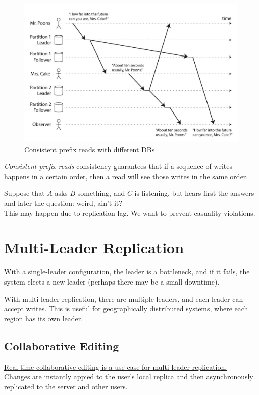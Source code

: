 \begin{paracol}{2}
   \begin{figure}[htbp]
      \centering
      \includegraphics[width=0.95\columnwidth]{images/10/consistentprefix.png}
      \caption{Consistent prefix reads with different DBs}
      \label{fig:10/consistentprefixs}
   \end{figure}

   \switchcolumn
   \colfill
   \textit{Consistent prefix reads} consistency guarantees that if a sequence of writes happens in a certain order, then a read will see those writes in the same order.
   
   Suppose that $A$ asks $B$ something, and $C$ is listening, but hears first the answers and later the question: weird, ain't it?\\
   This may happen due to replication lag. We want to prevent casuality violations.
   \colfill
\end{paracol}



\section{Multi-Leader Replication}
With a single-leader configuration, the leader is a bottleneck, and if it fails, the system elects a new leader (perhaps there may be a small downtime).

With multi-leader replication, there are multiple leaders, and each leader can accept writes. This is useful for geographically distributed systems, where each region has its own leader.

\subsection{Collaborative Editing}
\ul{Real-time collaborative editing is a use case for multi-leader replication.}\\
Changes are instantly appied to the user's local replica and then asynchronously replicated to the server and other users.

